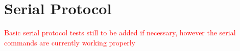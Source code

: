 \section{Serial Protocol}

\textcolor{red}{Basic serial protocol tests still to be added if necessary, however the serial commands are currently working properly}